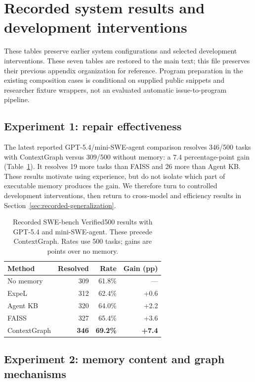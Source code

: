 \section{Recorded system results and development interventions}
\label{sec:recorded-results}
These tables preserve earlier system configurations and selected development
interventions. These seven tables are restored to the main text; this file preserves their
previous appendix organization for reference. Program preparation in the existing
composition cases is conditional on supplied public snippets and researcher
fixture wrappers, not an evaluated automatic issue-to-program pipeline.

\subsection{Experiment 1: repair effectiveness}
\label{sec:recorded-effectiveness}
The latest reported GPT-5.4/mini-SWE-agent comparison resolves 346/500 tasks
with ContextGraph versus 309/500 without memory: a 7.4 percentage-point gain
(Table~\ref{tab:verified500}). It resolves 19 more tasks than FAISS and 26 more
than Agent KB. These results motivate using experience, but do not isolate
which part of executable memory produces the gain. We therefore turn to
controlled development interventions, then return to cross-model and
efficiency results in Section~\ref{sec:recorded-generalization}.

\begin{table}[!htbp]
\centering
\caption{Recorded SWE-bench Verified500 results with GPT-5.4 and mini-SWE-agent.
These precede ContextGraph. Rates use 500 tasks; gains are points over no memory.}
\label{tab:verified500}
\begin{tabular}{lrrr}
\toprule
Method & Resolved & Rate & Gain (pp) \\
\midrule
No memory & 309 & 61.8\% & --- \\
ExpeL & 312 & 62.4\% & +0.6 \\
Agent KB & 320 & 64.0\% & +2.2 \\
FAISS & 327 & 65.4\% & +3.6 \\
ContextGraph & \textbf{346} & \textbf{69.2\%} & \textbf{+7.4} \\
\bottomrule
\end{tabular}
\end{table}

\subsection{Experiment 2: memory content and graph mechanisms}
\label{sec:recorded-interventions}
